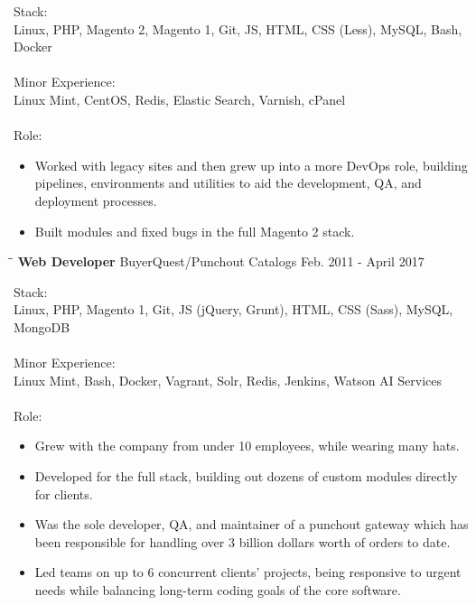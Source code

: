 \documentclass{res}
\begin{document}
\begin{resume}
    Stack: \\
	Linux, PHP, Magento 2, Magento 1, Git, JS, HTML, CSS (Less), MySQL, Bash, Docker \\
	\\
	Minor Experience: \\
	Linux Mint, CentOS, Redis, Elastic Search, Varnish, cPanel \\
	\\
	Role: \\
	\vspace{-0.15in}	
	\begin{itemize}
		\item Worked with legacy sites and then grew up into a more DevOps role, building pipelines, environments and utilities to aid the development, QA, and deployment processes.
		\item Built modules and fixed bugs in the full Magento 2 stack.
	\end{itemize}
    
   
   \begin{tabbing}
   		\hspace{2.0in}\= \hspace{2.7in}\= \kill %
    	\textbf{Web Developer} \>BuyerQuest/Punchout Catalogs     \>Feb. 2011 - April 2017\\
   \end{tabbing}\vspace{-20pt}      %
   
    Stack: \\
	Linux, PHP, Magento 1, Git, JS (jQuery, Grunt), HTML, CSS (Sass), MySQL, MongoDB \\
	\\
	Minor Experience: \\
	Linux Mint, Bash, Docker, Vagrant, Solr, Redis, Jenkins, Watson AI Services \\
	\\
	Role: \\
	\vspace{-0.15in}	
	\begin{itemize}
		\item Grew with the company from under 10 employees, while wearing many hats.
		\item Developed for the full stack, building out dozens of custom modules directly for clients.
		\item Was the sole developer, QA, and maintainer of a punchout gateway which has been responsible for handling over 3 billion dollars worth of orders to date.
		\item Led teams on up to 6 concurrent clients' projects, being responsive to urgent needs while balancing long-term coding goals of the core software.
	\end{itemize}
	

\end{resume}
\end{document}
